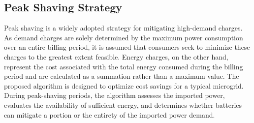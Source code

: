 \documentclass[conference]{IEEEtran}
\begin{document}
    \subsection{Peak Shaving Strategy}
		Peak shaving is a widely adopted strategy for mitigating high-demand charges. As demand charges are solely determined by the maximum power consumption over an entire billing period, it is assumed that consumers seek to minimize these charges to the greatest extent feasible. Energy charges, on the other hand, represent the cost associated with the total energy consumed during the billing period and are calculated as a summation rather than a maximum value. The proposed algorithm is designed to optimize cost savings for a typical microgrid. During peak-shaving periods, the algorithm assesses the imported power, evaluates the availability of sufficient energy, and determines whether batteries can mitigate a portion or the entirety of the imported power demand.
\end{document}

